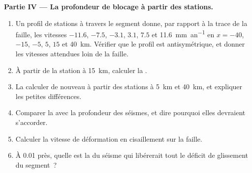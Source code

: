 \begin{problem}
\medskip
\noindent\textbf{Partie IV --- La profondeur de blocage à partir des stations.}
\begin{enumerate}[resume]
  \item Un profil de stations à travers le segment donne, par rapport à la trace de la
        faille, les vitesses $-11.6$, $-7.5$, $-3.1$, $3.1$, $7.5$ et
        \qty{11.6}{mm.an^{-1}} en $x = -40$, $-15$, $-5$, $5$, $15$ et
        \qty{40}{km}. Vérifier que le profil est antisymétrique, et donner les
        vitesses attendues loin de la faille.
  \item À partir de la station à \qty{15}{km}, calculer la .
  \item La calculer de nouveau à partir des stations à \qty{5}{km} et \qty{40}{km}, et
        expliquer les petites différences.
  \item Comparer la  avec la profondeur des séismes, et dire
        pourquoi elles devraient s'accorder.
  \item Calculer la vitesse de déformation en cisaillement sur la faille.
  \item À 0.01 près, quelle est la  du séisme qui
        libérerait tout le déficit de glissement du segment~?
\end{enumerate}
\end{problem}

